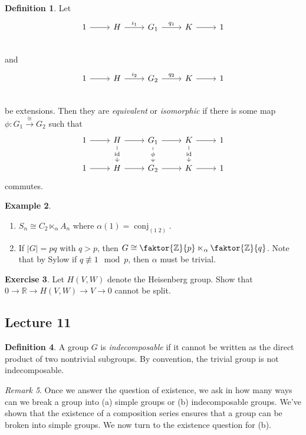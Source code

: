\documentclass[10pt,letterpaper,cm]{nupset}
\theoremstyle{definition}
\newtheorem{definition}{Definition}[subsection]
\newtheorem{exmp}[definition]{Example}
\theoremstyle{theorem}
\newtheorem{exercise}[definition]{Exercise}
\theoremstyle{remark}
\newtheorem{remark}[definition]{Remark}
\newcommand{\R}{\mathbb R}
\newcommand{\Z}{\mathbb Z}
\newcommand{\1}{\mathbf{1}}
\newcommand{\0}{\vec 0}
\DeclareMathOperator{\id}{id}
\DeclareMathOperator{\conj}{conj}
\begin{document}
\begin{definition}
Let \[
	\begin{tikzcd}
	1\rar &H\rar["i_1" above] & G_1 \rar["q_1" above] & K\rar& 1 \\
	\end{tikzcd}
\]
and 
\[
	\begin{tikzcd}
	1\rar &H\rar["i_2" above] & G_2 \rar["q_2" above] & K\rar& 1 \\
	\end{tikzcd}
\]
be extensions. Then they are \textit{equivalent} or \textit{isomorphic} if there is some map $\phi : G_1 \overset{\cong}{\longrightarrow} G_2$ such that 
\[
\begin{tikzcd}
1 \arrow[r] & H \arrow[r] \arrow[d, "\id" description] & G_1 \arrow[r] \arrow[d, "\phi" description] & K \arrow[r] \arrow[d, "\id" description] & 1 \\
1 \arrow[r] & H \arrow[r] & G_2 \arrow[r] & K \arrow[r] & 1
\end{tikzcd}
\]
commutes.
\end{definition}

\begin{exmp} $ $
\begin{enumerate}
\item $S_n \cong C_2 \ltimes_{\alpha} A_n$ where $\alpha(1) = \conj_{(1 \; 2)}$.
\item  If $|G| = pq$ with $q>p$, then $G \cong \faktor{\Z}{p} \ltimes_{\alpha} \faktor{\Z}{q}$. Note that by Sylow if $q\not \equiv 1 \mod p$, then $\alpha$ must be trivial. 
\end{enumerate}
\end{exmp}

\begin{exercise}
Let $H(V, W)$ denote the Heisenberg group. Show that $0 \to \R \to H(V, W) \to V \to 0$ cannot be split.
\end{exercise}

\subsection{Lecture 11}

\begin{definition}
A group $G$ is \textit{indecomposable} if it cannot be written as the direct product of two nontrivial subgroups. By convention, the trivial group is not indecomposable. 
\end{definition}

\begin{remark}
Once we answer the question of existence, we ask in how many ways can we break a group into (a) simple groups or (b) indecomposable groups. We've shown that the existence of a composition series ensures that a group can be broken into simple groups. We now turn to the existence question for (b).
\end{remark}
\end{document}
